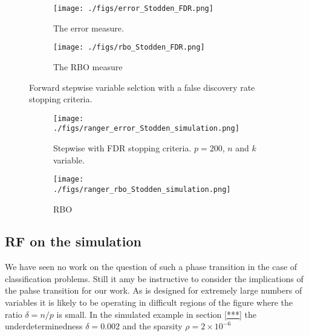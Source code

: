  \begin{figure}[tbhp] 
     \begin{subfigure}[t]{0.5\linewidth}
       \centering
       \texttt{[image: ./figs/error\_Stodden\_FDR.png]}
       \caption{The error measure.}
       \label{figure:error_Stodden_FDR.png}
     \end{subfigure} 
     \begin{subfigure}[t]{0.5\linewidth}
       \centering
       \texttt{[image: ./figs/rbo\_Stodden\_FDR.png]}
       \caption{The RBO measure}
       \label{figure:rbo_Stodden_FDR.png}
     \end{subfigure} 
     \caption{Forward stepwise variable selction with a false discovery rate stopping criteria.}
       \label{figure:error_Stodden_FDR.png}
 \end{figure}

 \begin{figure}[tbhp] 
     \begin{subfigure}[t]{0.5\linewidth}
       \centering
       \texttt{[image: ./figs/ranger\_error\_Stodden\_simulation.png]}
       \caption{Stepwise with FDR stopping criteria. $p=200$, $n$ and $k$ variable. }
       \label{figure:ranger_error_Stodden_simulation.png}
       \vspace{4ex}
     \end{subfigure} 
     \begin{subfigure}[t]{0.5\linewidth}
       \centering
       \texttt{[image: ./figs/ranger\_rbo\_Stodden\_simulation.png]}
       \caption{RBO}
       \label{figure:ranger_rbo_Stodden_simulation.png}
     \end{subfigure} 
     \caption{}
 \end{figure}


\subsection{RF on the simulation}

We have seen no work on the question of such a phase transition in the case of classification problems. Still it amy be
instructive to consider the implications of the pahse transition for our work. As \cursedforest is designed for
extremely large numbers of variables it is likely to be operating in difficult regions of the figure where the ratio
$\delta = n/p$ is small. In the simulated example in section \ref{***} the underdeterminedness $\delta = 0.002$ and the
sparsity $\rho =2\times 10^{-6}$

